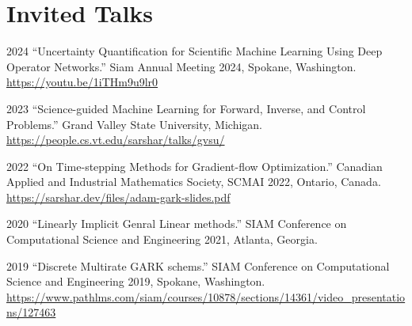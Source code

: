 \documentclass[11pt,letterpaper]{report}
\begin{document}





    \section*{Invited Talks}

    \begin{tablist}

        \item[2024] \tab{}\enquote{Uncertainty Quantification for Scientific Machine Learning Using Deep Operator Networks.}
        Siam Annual Meeting 2024, Spokane, Washington.
        \href{https://youtu.be/1iTHm9u9lr0?feature=shared}{https://youtu.be/1iTHm9u9lr0}

        \item[2023] \tab{}\enquote{Science-guided Machine Learning for Forward, Inverse, and Control Problems.}
        Grand Valley State University, Michigan.
        \href{https://people.cs.vt.edu/sarshar/talks/gvsu/}{https://people.cs.vt.edu/sarshar/talks/gvsu/}
   
        \item[2022] \tab{}\enquote{On Time-stepping Methods for Gradient-flow Optimization.} 
        Canadian Applied and Industrial Mathematics Society, SCMAI 2022, Ontario, Canada.
        \href{https://sarshar.dev/files/adam-gark-slides.pdf}{https://sarshar.dev/files/adam-gark-slides.pdf}

        \item[2020] \tab{}\enquote{Linearly Implicit Genral Linear methods.} SIAM Conference on Computational Science and Engineering 2021, Atlanta, Georgia. 

        \item[2019] \tab{}\enquote{Discrete Multirate GARK schems.}
        SIAM Conference on Computational Science and Engineering 2019, Spokane, Washington.
        \href{https://www.pathlms.com/siam/courses/10878/sections/14361/video\_presentations/127463}{https://www.pathlms.com/siam/courses/10878/sections/14361/video\_presentations/127463}

    \end{tablist}
\end{document}

